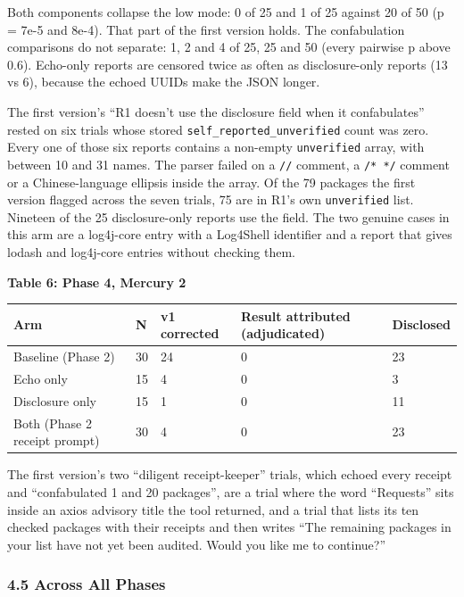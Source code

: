 \documentclass[
]{article}
\newcounter{none} %
\begin{document}
Both components collapse the low mode: 0 of 25 and 1 of 25 against 20 of
50 (p = 7e-5 and 8e-4). That part of the first version holds. The
confabulation comparisons do not separate: 1, 2 and 4 of 25, 25 and 50
(every pairwise p above 0.6). Echo-only reports are censored twice as
often as disclosure-only reports (13 vs 6), because the echoed UUIDs
make the JSON longer.

The first version's ``R1 doesn't use the disclosure field when it
confabulates'' rested on six trials whose stored
\texttt{self\_reported\_unverified} count was zero. Every one of those
six reports contains a non-empty \texttt{unverified} array, with between
10 and 31 names. The parser failed on a \texttt{//} comment, a
\texttt{/*\ */} comment or a Chinese-language ellipsis inside the array.
Of the 79 packages the first version flagged across the seven trials, 75
are in R1's own \texttt{unverified} list. Nineteen of the 25
disclosure-only reports use the field. The two genuine cases in this arm
are a log4j-core entry with a Log4Shell identifier and a report that
gives lodash and log4j-core entries without checking them.

\textbf{Table 6: Phase 4, Mercury 2}

{\def\LTcaptype{none} %
\begin{longtable}[]{@{}lllll@{}}
\toprule\noalign{}
Arm & N & v1 corrected & Result attributed (adjudicated) & Disclosed \\
\midrule\noalign{}
\endhead
\bottomrule\noalign{}
\endlastfoot
Baseline (Phase 2) & 30 & 24 & 0 & 23 \\
Echo only & 15 & 4 & 0 & 3 \\
Disclosure only & 15 & 1 & 0 & 11 \\
Both (Phase 2 receipt prompt) & 30 & 4 & 0 & 23 \\
\end{longtable}
}

The first version's two ``diligent receipt-keeper'' trials, which echoed
every receipt and ``confabulated 1 and 20 packages'', are a trial where
the word ``Requests'' sits inside an axios advisory title the tool
returned, and a trial that lists its ten checked packages with their
receipts and then writes ``The remaining packages in your list have not
yet been audited. Would you like me to continue?''

\subsubsection{4.5 Across All Phases}\label{across-all-phases}
\end{document}
